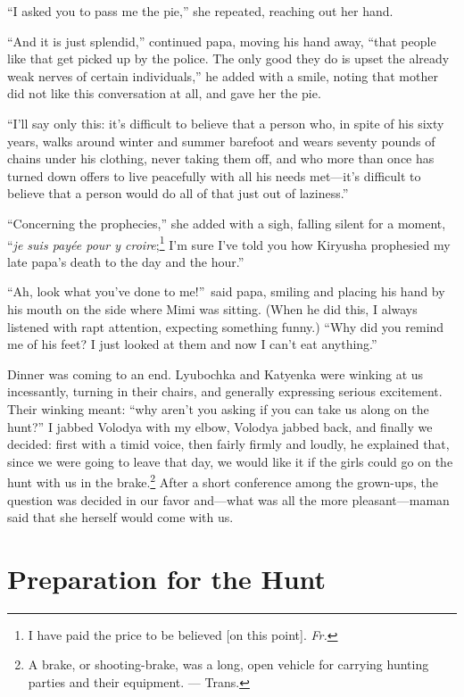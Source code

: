 ``I asked you to pass me the pie,'' she repeated, reaching out her hand. %

``And it is just splendid,'' continued papa, moving his hand away, ``that people like that get picked up by the police. The only good they do is upset the already weak nerves of certain individuals,'' he added with a smile, noting that mother did not like this conversation at all, and gave her the pie. %

``I'll say only this: it's difficult to believe that a person who, in spite of his sixty years, walks around winter and summer barefoot and wears seventy pounds of chains under his clothing, never taking them off, and who more than once has turned down offers to live peacefully with all his needs met---it's difficult to believe that a person would do all of that just out of laziness.'' %

``Concerning the prophecies,'' she added with a sigh, falling silent for a moment, ``\textit{je suis pay\'ee pour y croire};\footnote{I have paid the price to be believed [on this point]. \textit{Fr.}} I'm sure I've told you how Kiryusha prophesied my late papa's death to the day and the hour.'' %

``Ah, look what you've done to me!''~said papa, smiling and placing his hand by his mouth on the side where Mimi was sitting. (When he did this, I always listened with rapt attention, expecting something funny.) ``Why did you remind me of his feet? I just looked at them and now I can't eat anything.'' %

Dinner was coming to an end. Lyubochka and Katyenka were winking at us incessantly, turning in their chairs, and generally expressing serious excitement. Their winking meant: ``why aren't you asking if you can take us along on the hunt?'' I jabbed Volodya with my elbow, Volodya jabbed back, and finally we decided: first with a timid voice, then fairly firmly and loudly, he explained that, since we were going to leave that day, we would like it if the girls could go on the hunt with us in the brake.\footnote{A brake, or shooting-brake, was a long, open vehicle for carrying hunting parties and their equipment. --- Trans.} After a short conference among the grown-ups, the question was decided in our favor and---what was all the more pleasant---maman said that she herself would come with us.

\chapter{Preparation for the Hunt} %

